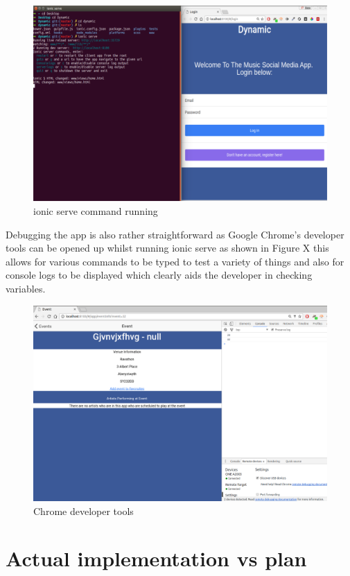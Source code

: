 \begin{figure}[H]
\includegraphics[scale=0.45]{images/chrome}
\caption{ionic serve command running}
\end{figure}

Debugging the app is also rather straightforward as Google Chrome's developer tools can be opened up whilst running ionic serve as shown in Figure X this allows for various commands to be typed to test a variety of things and also for console logs to be displayed which clearly aids the developer in checking variables.

\begin{figure}[H]
\includegraphics[scale=0.45]{images/chrome2}
\caption{Chrome developer tools}
\end{figure}
\section{Actual implementation vs plan}

